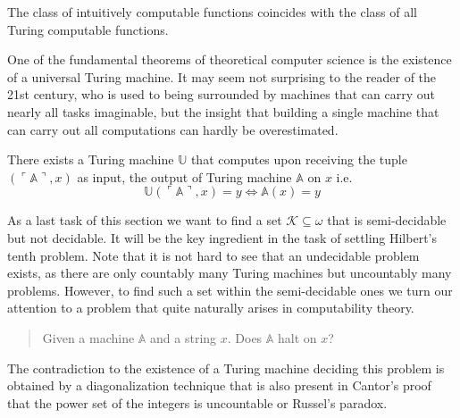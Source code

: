 \begin{churchturing}
  The class of intuitively computable
  functions coincides with the class of all Turing computable functions.
\end{churchturing}

One of the fundamental theorems of theoretical computer science is the existence
of a universal Turing machine. It may seem not surprising to the reader of the
21\textup{st} century, who is used to being surrounded by machines that can
carry out nearly all tasks imaginable, but the insight that building a single
machine that can carry out all computations can hardly be overestimated.

\begin{thm}
    There exists a Turing machine $\mathbb U$ that computes upon receiving
    the tuple $(\ulcorner \mathbb A \urcorner, x)$ as input, the output of
    Turing machine $\mathbb A$ on $x$ i.e.
    \[
      \mathbb U(\ulcorner \mathbb A \urcorner, x) = y \Leftrightarrow
        \mathbb A (x) = y
    \]
\end{thm}

As a last task of this section we want to find a set \(\mathcal{K} \subseteq ω\)
that is semi-decidable but not decidable. It will be the key ingredient in the
task of settling Hilbert's tenth problem. Note that it is not hard to see that
an undecidable problem exists, as there are only countably many Turing machines
but uncountably many problems. However, to find such a set within the
semi-decidable ones we turn our attention to a problem that quite naturally
arises in computability theory.
\begin{quote}
  Given a machine $\mathbb A$ and a string $x$. Does $\mathbb A$
  halt on $x$?
\end{quote}
The contradiction to the existence of a Turing machine deciding this problem is
obtained by a diagonalization technique that is also present in Cantor's proof
that the power set of the integers is uncountable or Russel's paradox.

